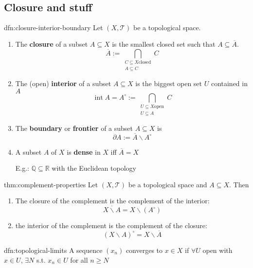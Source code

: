 \documentclass{article}
\DeclareMathOperator{\Int}{int}
\begin{document}
\newpage
\subsection{Closure and stuff}

\begin{dfn}{dfn:closure-interior-boundary}{}
    Let $(X, \mathcal{T})$ be a topological space.
    \begin{enumerate}
        \item The \textbf{closure} of a subset $A \subseteq X$ is the smallest closed set such that $A \subseteq \overline{A}$.
            \[\overline{A} := \bigcap\limits_{\substack{C \subseteq X \text{closed} \\ A \subseteq C}} C\]
        \item The (open) \textbf{interior} of a subset $A \subseteq X$ is the biggest open set $U$ contained in $A$
            \[\Int{A} = A^{\circ} := \bigcap\limits_{\substack{U \subseteq X \text{open} \\ U \subseteq A}} C\]
        \item The \textbf{boundary} or \textbf{frontier} of a subset $A \subseteq X$ is
            \[\partial A := \overline{A} \backslash A^{\circ}\]
        \item A subset $A$ of $X$ is \textbf{dense} in $X$ iff $\overline{A} = X$

            E.g.: $\mathbb{Q} \subseteq \mathbb{R}$ with the Euclidean topology
    \end{enumerate}
\end{dfn}

\begin{thm}{thm:complement-properties}{}
    Let $(X, \mathcal{T})$ be a topological space and $A \subseteq X$. Then
    \begin{enumerate}
        \item The closure of the complement is the complement of the interior:
            \[\overline{X \backslash A} = X \backslash (A^{\circ})\]
        \item the interior of the complement is the complement of the closure:
            \[(X \backslash A)^{\circ} = X \backslash \overline{A}\]
    \end{enumerate}
\end{thm}

\begin{dfn}{dfn:topological-limits}{}
    A sequence $(x_{n})$ converges to $x\in X$ if $\forall U$ open with $x\in U$, $\exists N$ s.t. $x_{n}\in U$ for all $n \ge N$
\end{dfn}
\end{document}

